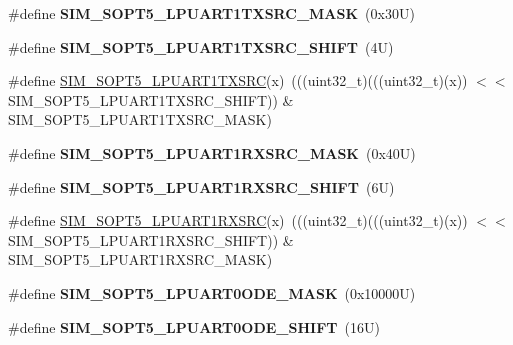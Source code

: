 \begin{DoxyCompactItemize}
\#define {\bfseries S\+I\+M\+\_\+\+S\+O\+P\+T5\+\_\+\+L\+P\+U\+A\+R\+T1\+T\+X\+S\+R\+C\+\_\+\+M\+A\+SK}~(0x30\+U)
\item 
\mbox{\label{group___s_i_m___register___masks_ga8b42dc4c74831c91569a3bb486abae29}} 
\#define {\bfseries S\+I\+M\+\_\+\+S\+O\+P\+T5\+\_\+\+L\+P\+U\+A\+R\+T1\+T\+X\+S\+R\+C\+\_\+\+S\+H\+I\+FT}~(4\+U)
\item 
\#define \mbox{\hyperlink{group___s_i_m___register___masks_gadc7c3b7798af8801ca3da3c4b547f7fa}{S\+I\+M\+\_\+\+S\+O\+P\+T5\+\_\+\+L\+P\+U\+A\+R\+T1\+T\+X\+S\+RC}}(x)~(((uint32\+\_\+t)(((uint32\+\_\+t)(x)) $<$$<$ S\+I\+M\+\_\+\+S\+O\+P\+T5\+\_\+\+L\+P\+U\+A\+R\+T1\+T\+X\+S\+R\+C\+\_\+\+S\+H\+I\+FT)) \& S\+I\+M\+\_\+\+S\+O\+P\+T5\+\_\+\+L\+P\+U\+A\+R\+T1\+T\+X\+S\+R\+C\+\_\+\+M\+A\+SK)
\item 
\mbox{\label{group___s_i_m___register___masks_gab8b38e2b158d31a9b1f1fd7543d18431}} 
\#define {\bfseries S\+I\+M\+\_\+\+S\+O\+P\+T5\+\_\+\+L\+P\+U\+A\+R\+T1\+R\+X\+S\+R\+C\+\_\+\+M\+A\+SK}~(0x40\+U)
\item 
\mbox{\label{group___s_i_m___register___masks_gaae025ce7f10d19cef95d35fa512c682d}} 
\#define {\bfseries S\+I\+M\+\_\+\+S\+O\+P\+T5\+\_\+\+L\+P\+U\+A\+R\+T1\+R\+X\+S\+R\+C\+\_\+\+S\+H\+I\+FT}~(6\+U)
\item 
\#define \mbox{\hyperlink{group___s_i_m___register___masks_ga93af0fe0d78b382084de053afd1f9a61}{S\+I\+M\+\_\+\+S\+O\+P\+T5\+\_\+\+L\+P\+U\+A\+R\+T1\+R\+X\+S\+RC}}(x)~(((uint32\+\_\+t)(((uint32\+\_\+t)(x)) $<$$<$ S\+I\+M\+\_\+\+S\+O\+P\+T5\+\_\+\+L\+P\+U\+A\+R\+T1\+R\+X\+S\+R\+C\+\_\+\+S\+H\+I\+FT)) \& S\+I\+M\+\_\+\+S\+O\+P\+T5\+\_\+\+L\+P\+U\+A\+R\+T1\+R\+X\+S\+R\+C\+\_\+\+M\+A\+SK)
\item 
\mbox{\label{group___s_i_m___register___masks_ga9723c69aea5b7bcc0d62b3b1c8bbf503}} 
\#define {\bfseries S\+I\+M\+\_\+\+S\+O\+P\+T5\+\_\+\+L\+P\+U\+A\+R\+T0\+O\+D\+E\+\_\+\+M\+A\+SK}~(0x10000\+U)
\item 
\mbox{\label{group___s_i_m___register___masks_ga54d5030bf86edab8ae8cf157764eb9fd}} 
\#define {\bfseries S\+I\+M\+\_\+\+S\+O\+P\+T5\+\_\+\+L\+P\+U\+A\+R\+T0\+O\+D\+E\+\_\+\+S\+H\+I\+FT}~(16\+U)

\end{DoxyCompactItemize}
